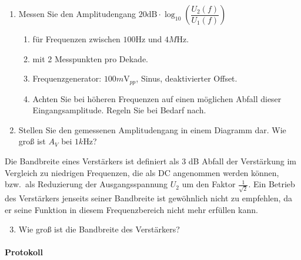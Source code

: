 \documentclass[10pt]{scrreprt}
\begin{document}
    \begin{enumerate}
        \item Messen Sie den Amplitudengang $20 \text{dB} \cdot \log_{10} \left( \dfrac{U_2(f)}{U_1(f)} \right)$
            \begin{enumerate}
                \item für Frequenzen zwischen $100\si{\hertz}$ und $4\si{M\hertz}$.
                \item mit 2 Messpunkten pro Dekade.
                \item Frequenzgenerator: $100 \si{m\volt}_{pp}$, Sinus, deaktivierter Offset.
                \item Achten Sie bei höheren Frequenzen auf einen möglichen Abfall dieser
                    Eingangsamplitude. Regeln Sie bei Bedarf nach.
            \end{enumerate}
        \item Stellen Sie den gemessenen Amplitudengang in einem Diagramm dar. Wie groß ist
            $A_V$ bei $1\si{k\hertz}$?
    \end{enumerate}
    Die Bandbreite eines Verstärkers ist definiert als 3 dB Abfall der Verstärkung im Vergleich
    zu niedrigen Frequenzen, die als DC angenommen werden können, bzw.\ als Reduzierung
    der Ausgangsspannung $U_2$ um den Faktor $\frac{1}{\sqrt{2}}$. Ein Betrieb des Verstärkers jenseits seiner
    Bandbreite ist gewöhnlich nicht zu empfehlen, da er seine Funktion in diesem
    Frequenzbereich nicht mehr erfüllen kann.
    \begin{enumerate}
        \setcounter{enumi}{2}
        \item Wie groß ist die Bandbreite des Verstärkers?
    \end{enumerate}

    \paragraph{Protokoll}
\end{document}
